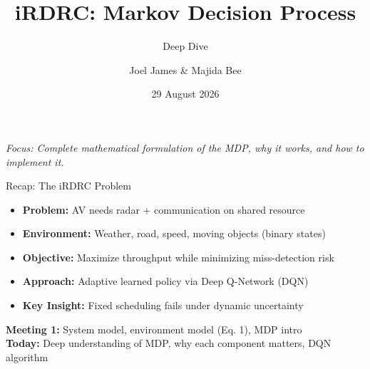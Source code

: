 \documentclass{beamer}
\title{iRDRC: Markov Decision Process}
\subtitle{Deep Dive}
\author{Joel James \& Majida Bee}
\date{29 August 2026}
\institute{IIIT Kottayam --- BTP Discussion 2}
\begin{document}
\begin{frame}[plain]
  \titlepage
  \vspace{-0.5cm}
  \begin{center}
    \small\textit{Focus: Complete mathematical formulation of the MDP, why it works, and how to implement it.}
  \end{center}
\end{frame}


\begin{frame}{Recap: The iRDRC Problem}
  \begin{itemize}
    \item \textbf{Problem:} AV needs radar + communication on shared resource
    \item \textbf{Environment:} Weather, road, speed, moving objects (binary states)
    \item \textbf{Objective:} Maximize throughput while minimizing miss-detection risk
    \item \textbf{Approach:} Adaptive learned policy via Deep Q-Network (DQN)
    \item \textbf{Key Insight:} Fixed scheduling fails under dynamic uncertainty
  \end{itemize}

  \vspace{0.3cm}
  \begin{center}
    \small
    \textbf{Meeting 1:} System model, environment model (Eq. 1), MDP intro\\
    \textbf{Today:} Deep understanding of MDP, why each component matters, DQN algorithm
  \end{center}
\end{frame}
\end{document}
